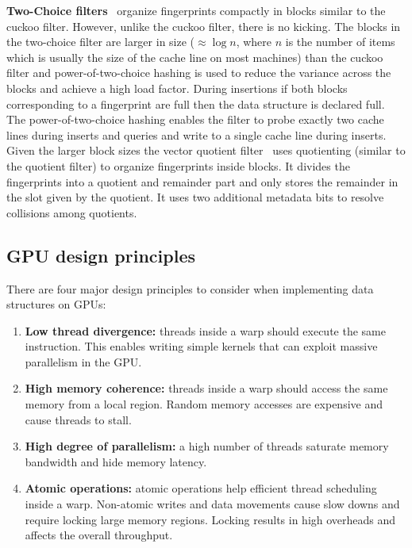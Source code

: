 \textbf{Two-Choice filters}~\cite{pandeySigmod21} organize fingerprints compactly in blocks similar to the cuckoo filter. However, unlike the cuckoo filter, there is no kicking. The blocks in the two-choice filter are larger in size ($\approx \log{n}$, where $n$ is the number of items which is usually the size of the cache line on most machines) than the cuckoo filter and power-of-two-choice hashing is used to reduce the variance across the blocks and achieve a high load factor. During insertions if both blocks corresponding to a fingerprint are full then the data structure is declared full. The power-of-two-choice hashing enables the filter to probe exactly two cache lines during inserts and queries and write to a single cache line during inserts. Given the larger block sizes the vector quotient filter~\cite{pandeySigmod21} uses quotienting (similar to the quotient filter) to organize fingerprints inside blocks. It divides the fingerprints into a quotient and remainder part and only stores the remainder in the slot given by the quotient. It uses two additional metadata bits to resolve collisions among quotients.


\subsection{GPU design principles}
There are four major design principles to consider when implementing data structures on GPUs:

\begin{enumerate}[noitemsep, leftmargin=*]
    \item \textbf{Low thread divergence:} threads inside a warp should execute the same instruction. This enables writing simple kernels that can exploit massive parallelism in the GPU.
    \item \textbf{High memory coherence:} threads inside a warp should access the same  memory from a local region. Random memory accesses are expensive and cause threads to stall.
    \item \textbf{High degree of parallelism:} a high number of threads saturate memory bandwidth and hide memory latency. 
    \item \textbf{Atomic operations:} atomic operations help efficient thread scheduling inside a warp. Non-atomic writes and data movements cause slow downs and require locking large memory regions. Locking results in high overheads and affects the overall throughput.
\end{enumerate}


